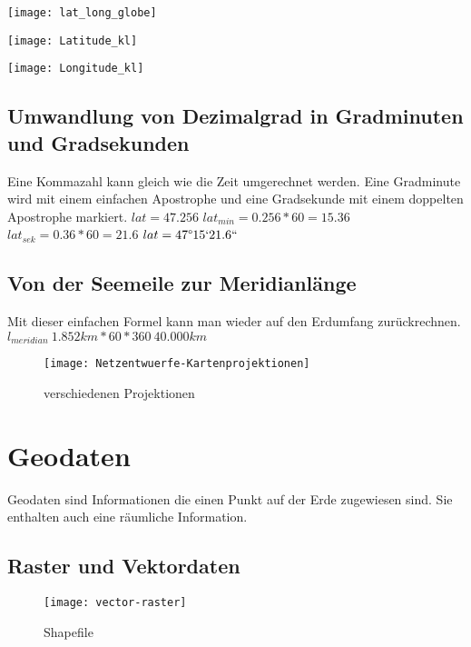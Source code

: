 \documentclass[11pt,fleqn]{book} %
\begin{document}
\begin{minipage}[t]{0.3\textwidth}
\texttt{[image: lat\_long\_globe]}
\end{minipage}
\begin{minipage}[t]{0.3\textwidth}
\texttt{[image: Latitude\_kl]}
\end{minipage}
\begin{minipage}[t]{0.3\textwidth}
\texttt{[image: Longitude\_kl]}
\end{minipage}
 
 
 
\section{Umwandlung von Dezimalgrad in Gradminuten und Gradsekunden}
Eine Kommazahl kann gleich wie die Zeit umgerechnet werden. Eine Gradminute wird mit einem einfachen Apostrophe und eine Gradsekunde mit einem doppelten Apostrophe markiert.
$lat=47.256$
$lat_{min}=0.256*60=15.36$
$lat_{sek}=0.36*60=21.6$
$lat=47\degree15`21.6``$
\section{Von der Seemeile zur Meridianl\"ange}
Mit dieser einfachen Formel kann man wieder auf den Erdumfang zur\"uckrechnen.
$l_{meridian}~1.852km*60*360~40.000km$

\begin{figure}[h]
\centering\texttt{[image: Netzentwuerfe-Kartenprojektionen]}
\caption{verschiedenen Projektionen}
\end{figure}



\chapter{Geodaten}
Geodaten sind Informationen die einen Punkt auf der Erde zugewiesen sind. Sie enthalten auch eine r\"aumliche Information.
\section{Raster und Vektordaten}

\begin{figure}[h]
\centering\texttt{[image: vector-raster]}
\caption{Shapefile}
\end{figure}
\end{document}
